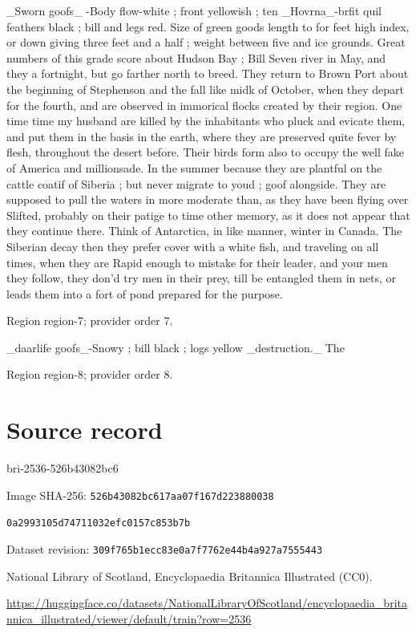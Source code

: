 \documentclass[11pt]{article}
\begin{document}
\_Sworn goofs\_ -Body flow-white ; front yellowish ; ten \_Hovrna\_-brfit quil feathers black ; bill and legs red. Size of green goods length to for feet high index, or down giving three feet and a half ; weight between five and ice grounds. Great numbers of this grade score about Hudson Bay ; Bill Seven river in May, and they a fortnight, but go farther north to breed. They return to Brown Port about the beginning of Stephenson and the fall like midk of October, when they depart for the fourth, and are observed in immorical flocks created by their region. One time time my husband are killed by the inhabitants who pluck and evicate them, and put them in the basis in the earth, where they are preserved quite fever by flesh, throughout the desert before. Their birds form also to occupy the well fake of America and millionsade. In the summer because they are plantful on the cattle coatif of Siberia ; but never migrate to youd ; goof alongside. They are supposed to pull the waters in more moderate than, as they have been flying over Slifted, probably on their patige to time other memory, as it does not appear that they continue there. Think of Antarctica, in like manner, winter in Canada. The Siberian decay then they prefer cover with a white fish, and traveling on all times, when they are Rapid enough to mistake for their leader, and your men they follow, they don’d try men in their prey, till be entangled them in nets, or leads them into a fort of pond prepared for the purpose.
\par

{\scriptsize\color{gray} Region region-7; provider order 7.\par}
\medskip

\_daarlife goofs\_-Snowy ; bill black ; logs yellow \_destruction.\_ The
\par

{\scriptsize\color{gray} Region region-8; provider order 8.\par}
\medskip
\newpage\section*{Source record}
bri-2536-526b43082bc6\par
Image SHA-256: \texttt{526b43082bc617aa07f167d223880038}\par\texttt{0a2993105d74711032efc0157c853b7b}\par
Dataset revision: \texttt{309f765b1ecc83e0a7f7}\texttt{762e44b4a927a7555443}\par
National Library of Scotland, Encyclopaedia Britannica Illustrated (CC0).\par
\url{https://huggingface.co/datasets/NationalLibraryOfScotland/encyclopaedia_britannica_illustrated/viewer/default/train?row=2536}
\end{document}
